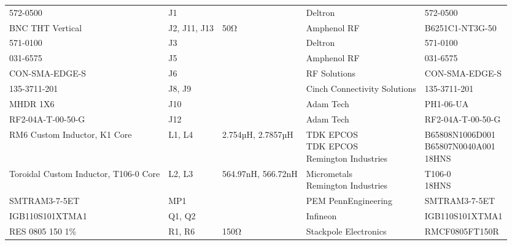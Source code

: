 \documentclass{standalone}
\begin{document}
\begin{tabular}{lllll}
	572-0500                              & J1                  &                    & Deltron                      & 572-0500             \\
	BNC THT Vertical                      & J2, J11, J13        & 50Ω                & Amphenol RF                  & B6251C1-NT3G-50      \\
	571-0100                              & J3                  &                    & Deltron                      & 571-0100             \\
	031-6575                              & J5                  &                    & Amphenol RF                  & 031-6575             \\
	CON-SMA-EDGE-S                        & J6                  &                    & RF Solutions                 & CON-SMA-EDGE-S       \\
	135-3711-201                          & J8, J9              &                    & Cinch Connectivity Solutions & 135-3711-201         \\
	MHDR 1X6                              & J10                 &                    & Adam Tech                    & PH1-06-UA            \\
	RF2-04A-T-00-50-G                     & J12                 &                    & Adam Tech                    & RF2-04A-T-00-50-G    \\
	RM6 Custom Inductor, K1 Core          & L1, L4              & 2.754µH, 2.7857µH  & \makecell[lt]{TDK EPCOS                             \\ TDK EPCOS\\ Remington Industries} & \makecell[lt]{B65808N1006D001 \\ B65807N0040A001 \\ 18HNS} \\
	Toroidal Custom Inductor, T106-0 Core & L2, L3              & 564.97nH, 566.72nH & \makecell[lt]{Micrometals                           \\ Remington Industries} & \makecell[lt]{T106-0 \\ 18HNS} \\
	SMTRAM3-7-5ET                         & MP1                 &                    & PEM PennEngineering          & SMTRAM3-7-5ET        \\
	IGB110S101XTMA1                       & Q1, Q2              &                    & Infineon                     & IGB110S101XTMA1      \\
	RES 0805 150 1\%                      & R1, R6              & 150Ω               & Stackpole Electronics        & RMCF0805FT150R       \\

\end{tabular}
\end{document}
